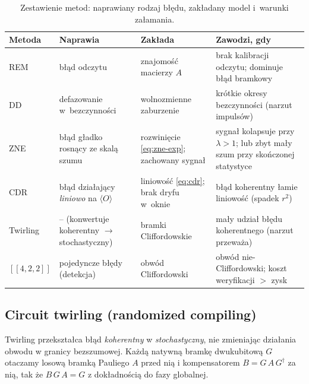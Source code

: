 \documentclass[11pt]{article}
\newcommand{\expv}{\langle O\rangle}
\begin{document}
\begin{table}[!ht]\centering
\caption{Zestawienie metod: naprawiany rodzaj błędu, zakładany model i~warunki załamania.}
\label{tab:metody}
\begin{tabular}{lp{2.7cm}p{3.2cm}p{4.6cm}}
\toprule
Metoda & Naprawia & Zakłada & Zawodzi, gdy \\
\midrule
REM & błąd odczytu & znajomość macierzy $A$ & brak kalibracji odczytu; dominuje błąd bramkowy \\
DD & defazowanie w~bezczynności & wolnozmienne zaburzenie & krótkie okresy bezczynności (narzut impulsów) \\
ZNE & błąd gładko rosnący ze skalą szumu & rozwinięcie \eqref{eq:zne-exp}; zachowany sygnał & sygnał kolapsuje przy $\lambda>1$; lub zbyt mały szum przy skończonej statystyce \\
CDR & błąd działający \emph{liniowo} na $\expv$ & liniowość \eqref{eq:cdr}; brak dryfu w~oknie & błąd koherentny łamie liniowość (spadek $r^2$) \\
Twirling & -- (konwertuje koherentny $\to$ stochastyczny) & bramki Cliffordowskie & mały udział błędu koherentnego (narzut przeważa) \\
$[[4,2,2]]$ & pojedyncze błędy (detekcja) & obwód Cliffordowski & obwód nie-Cliffordowski; koszt weryfikacji $>$ zysk \\
\bottomrule
\end{tabular}
\end{table}


\subsection{Circuit twirling (randomized compiling)}\label{sec:twirl-metoda}

Twirling przekształca błąd \emph{koherentny} w \emph{stochastyczny}, nie zmieniając działania obwodu
w granicy bezszumowej. Każdą natywną bramkę dwukubitową $G$ otaczamy losową bramką Pauliego $A$
przed nią i kompensatorem $B=G\,A\,G^{\dagger}$ za nią, tak że $B\,G\,A = G$ z dokładnością do fazy
globalnej.
\end{document}
